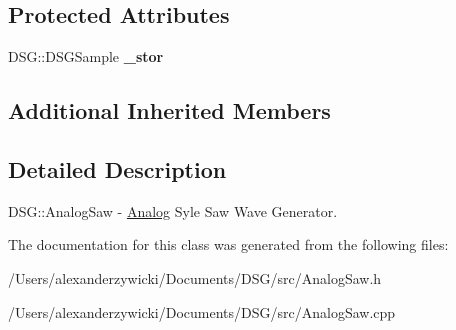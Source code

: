 \subsection*{Protected Attributes}
\begin{DoxyCompactItemize}
\item 
\hypertarget{class_d_s_g_1_1_analog_1_1_analog_saw_a81a923800bb8ba0f788d3567d2965d2a}{D\+S\+G\+::\+D\+S\+G\+Sample {\bfseries \+\_\+stor}}\label{class_d_s_g_1_1_analog_1_1_analog_saw_a81a923800bb8ba0f788d3567d2965d2a}

\end{DoxyCompactItemize}
\subsection*{Additional Inherited Members}


\subsection{Detailed Description}
D\+S\+G\+::\+Analog\+Saw -\/ \hyperlink{namespace_d_s_g_1_1_analog}{Analog} Syle Saw Wave Generator. 

The documentation for this class was generated from the following files\+:\begin{DoxyCompactItemize}
\item 
/\+Users/alexanderzywicki/\+Documents/\+D\+S\+G/src/Analog\+Saw.\+h\item 
/\+Users/alexanderzywicki/\+Documents/\+D\+S\+G/src/Analog\+Saw.\+cpp\end{DoxyCompactItemize}
